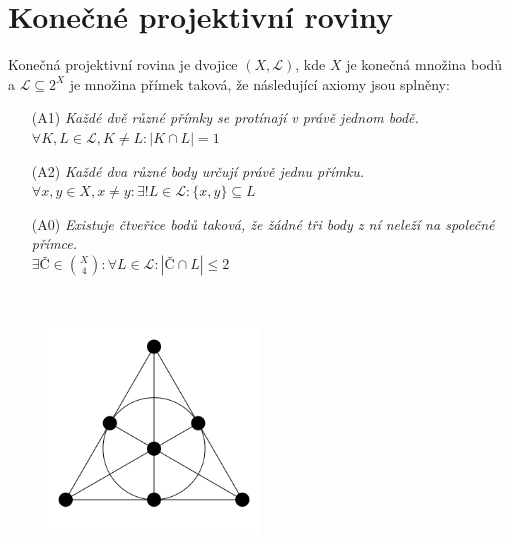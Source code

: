 \section{Konečné projektivní roviny}
\begin{t_definition}
  Konečná projektivní rovina je dvojice $(X, \mathcal{L})$, kde $X$ je konečná množina bodů a $\mathcal{L}\subseteq 2^X$ je množina přímek taková, že následující axiomy jsou splněny:
  \begin{enumerate}
    \item[(A1)]
    \textit{Každé dvě různé přímky se protínají v právě jednom bodě.}
    \\$\forall K,L\in\mathcal{L},K\neq L : |K\cap L|=1$
    \item[(A2)]
    \textit{Každé dva různé body určují právě jednu přímku.}
    \\$\forall x,y\in X,x\neq y : \exists! L\in\mathcal{L} : \{x, y\}\subseteq L$
    \item[(A0)]
    \textit{Existuje čtveřice bodů taková, že žádné tři body z ní neleží na společné přímce.}
    \\$\exists Č\in\binom{X}{4}:\forall L\in\mathcal{L}:|Č\cap L|\leq 2$
  \end{enumerate}
\end{t_definition}

\begin{t_example}$ $
  \begin{figure}[!htbp]
    \centering
    \includegraphics[width=0.5\textwidth]{img/fano_plane.png}
  \end{figure}
\end{t_example}

